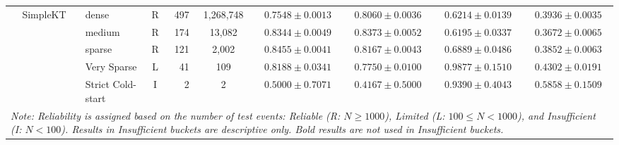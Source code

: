 \begin{table}[tbp]
{\begin{tabular}{lllcrccccc}
 & SimpleKT & dense & R & 497 & 1,268,748 & $0.7548 \pm 0.0013$ & $0.8060 \pm 0.0036$ & $0.6214 \pm 0.0139$ & $0.3936 \pm 0.0035$ \\
 &  & medium & R & 174 & 13,082 & $0.8344 \pm 0.0049$ & $0.8373 \pm 0.0052$ & $0.6195 \pm 0.0337$ & $0.3672 \pm 0.0065$ \\
 &  & sparse & R & 121 & 2,002 & $0.8455 \pm 0.0041$ & $0.8167 \pm 0.0043$ & $0.6889 \pm 0.0486$ & $0.3852 \pm 0.0063$ \\
 &  & Very Sparse & L & 41 & 109 & $0.8188 \pm 0.0341$ & $0.7750 \pm 0.0100$ & $0.9877 \pm 0.1510$ & $0.4302 \pm 0.0191$ \\
 &  & Strict Cold-start & I & 2 & 2 & $0.5000 \pm 0.7071$ & $0.4167 \pm 0.5000$ & $0.9390 \pm 0.4043$ & $0.5858 \pm 0.1509$ \\
\bottomrule
\multicolumn{10}{p{8.2cm}}{\scriptsize \textit{Note: Reliability is assigned based on the number of test events: Reliable (R: $N \ge 1000$), Limited (L: $100 \le N < 1000$), and Insufficient (I: $N < 100$). Results in Insufficient buckets are descriptive only. Bold results are not used in Insufficient buckets.}} \\
\end{tabular}%
}
\end{table}
